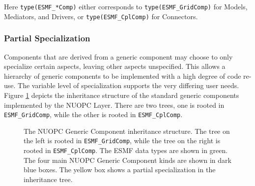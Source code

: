 Here {\tt type(ESMF\_*Comp)} either corresponds to {\tt type(ESMF\_GridComp)} for Models, Mediators, and Drivers, or {\tt type(ESMF\_CplComp)} for Connectors.

\subsubsection{Partial Specialization}

Components that are derived from a generic component may choose to only specialize certain aspects, leaving other aspects unspecified. This allows a hierarchy of generic components to be implemented with a high degree of code re-use. The variable level of specialization supports the very differing user needs. Figure \ref{fig:NUOPCGenericComp} depicts the inheritance structure of the standard generic components implemented by the NUOPC Layer. There are two trees, one is rooted in {\tt ESMF\_GridComp}, while the other is rooted in {\tt ESMF\_CplComp}.

\begin{figure}[h]
\begin{center}
\vspace{.5in}
\end{center}
\caption{The NUOPC Generic Component inheritance structure. The tree on the left is rooted in {\tt ESMF\_GridComp}, while the tree on the right is rooted in {\tt ESMF\_CplComp}. The ESMF data types are shown in green. The four main NUOPC Generic Component kinds are shown in dark blue boxes. The yellow box shows a partial specialization in the inheritance tree.}
\label{fig:NUOPCGenericComp}
\end{figure}



